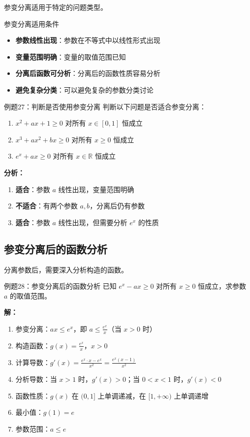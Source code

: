 \documentclass[a4paper,11pt]{ctexart}
\theoremstyle{definition}
\theoremstyle{remark}
\begin{document}
参变分离适用于特定的问题类型。

\begin{conceptbox}{参变分离适用条件}
\begin{itemize}
    \item \textbf{参数线性出现}：参数在不等式中以线性形式出现
    \item \textbf{变量范围明确}：变量的取值范围已知
    \item \textbf{分离后函数可分析}：分离后的函数性质容易分析
    \item \textbf{避免复杂分类}：可以避免复杂的参数分类讨论
\end{itemize}
\end{conceptbox}

\begin{examplebox}{例题27：判断是否使用参变分离}
判断以下问题是否适合参变分离：
\begin{enumerate}
    \item $x^2 + ax + 1 \geq 0$ 对所有 $x \in [0,1]$ 恒成立
    \item $x^3 + ax^2 + bx \geq 0$ 对所有 $x \geq 0$ 恒成立
    \item $e^x + ax \geq 0$ 对所有 $x \in \mathbb{R}$ 恒成立
\end{enumerate}

\textbf{分析：}
\begin{enumerate}
    \item \textbf{适合}：参数 $a$ 线性出现，变量范围明确
    \item \textbf{不适合}：有两个参数 $a, b$，分离后仍有参数
    \item \textbf{适合}：参数 $a$ 线性出现，但需要分析 $e^x$ 的性质
\end{enumerate}
\end{examplebox}

\subsection{参变分离后的函数分析}

分离参数后，需要深入分析构造的函数。

\begin{examplebox}{例题28：参变分离后的函数分析}
已知 $e^x - ax \geq 0$ 对所有 $x \geq 0$ 恒成立，求参数 $a$ 的取值范围。

\textbf{解：}
\begin{enumerate}
    \item 参变分离：$ax \leq e^x$，即 $a \leq \frac{e^x}{x}$（当 $x > 0$ 时）
    \item 构造函数：$g(x) = \frac{e^x}{x}$，$x > 0$
    \item 计算导数：$g'(x) = \frac{e^x \cdot x - e^x}{x^2} = \frac{e^x(x-1)}{x^2}$
    \item 分析导数：当 $x > 1$ 时，$g'(x) > 0$；当 $0 < x < 1$ 时，$g'(x) < 0$
    \item 函数性质：$g(x)$ 在 $(0,1]$ 上单调递减，在 $[1,+\infty)$ 上单调递增
    \item 最小值：$g(1) = e$
    \item 参数范围：$a \leq e$
\end{enumerate}
\end{examplebox}
\end{document}
